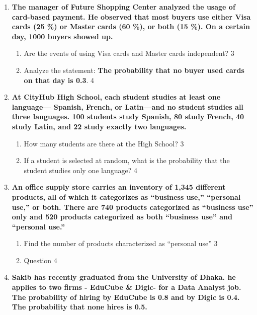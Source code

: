 \documentclass[a4paper,oneside, margin=1.4in]{book}
\begin{document}
\begin{enumerate}
   \item
	  \textbf{The manager of Future Shopping Center analyzed the usage of card-based payment. He observed that most buyers use either Visa cards (25 \%) or Master cards (60 \%), or both (15 \%). On a certain day, 1000 buyers showed up.} 
  
  \begin{enumerate}
    \item  
	Are the events of using Visa cards and Master cards independent? \hfill 3
    \item
	Analyze the statement: \textbf{The probability that no buyer used cards on that day is 0.3}. \hfill 4
  \end{enumerate}
  
   \item
	  \textbf{At CityHub High School, each student studies at least one language— Spanish, French, or Latin—and no student studies all three languages. 100 students study Spanish, 80 study French, 40 study Latin, and 22 study exactly two languages.} 
  
  \begin{enumerate}
    \item  
	How many students are there at the High School? \hfill 3
    \item
	If a student is selected at random, what is the probability that the student studies only one language? \hfill 4
  \end{enumerate}

 \item
	  \textbf{An office supply store carries an inventory of 1,345 different products, all of which it categorizes as “business use,” “personal use,” or both. There are 740 products categorized as “business use” only and 520 products categorized as both “business use” and “personal use.”} 
  
  \begin{enumerate}
    \item  
	Find the number of products characterized as “personal use” \hfill 3
    \item
	Question \hfill 4
  \end{enumerate}

  
   \item
  \textbf{Sakib has recently graduated from the University of Dhaka. he applies to two firms - EduCube \& Digic- for a Data Analyst job. The probability of hiring by EduCube is 0.8 and by Digic is 0.4. The probability that none hires is 0.5.} 
  

\end{enumerate}
\end{document}
